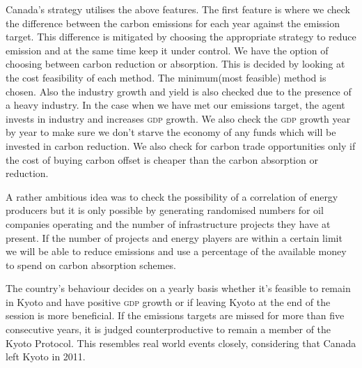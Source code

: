 Canada's strategy utilises the above features. The first feature is where we check the difference between the carbon emissions for each year against the emission target. This difference is mitigated by choosing the appropriate strategy to reduce emission and at the same time keep it under control. We have the option of choosing between carbon reduction or absorption. This is decided by looking at the cost feasibility of each method. The minimum(most feasible) method is chosen. Also the industry growth and yield is also checked due to the presence of a heavy industry. In the case when we have met our emissions target, the agent invests in industry and increases \textsc{gdp} growth. We also check the \textsc{gdp} growth year by year to make sure we don't starve the economy of any funds which will be invested in carbon reduction. We also check for carbon trade opportunities only if the cost of buying carbon offset is cheaper than the carbon absorption or reduction.

A rather ambitious idea was to check the possibility of a correlation of energy producers but it is only possible by generating randomised numbers for oil companies operating and the number of infrastructure projects they have at present. If the number of projects and energy players are within a certain limit we will be able to reduce emissions and use a percentage of the available money to spend on carbon absorption schemes.

The country's behaviour decides on a yearly basis whether it's feasible to remain in Kyoto and have positive \textsc{gdp} growth or if leaving Kyoto at the end of the session is more beneficial. If the emissions targets are missed for more than five consecutive years, it is judged counterproductive to remain a member of the Kyoto Protocol. This resembles real world events closely, considering that Canada left Kyoto in 2011.
